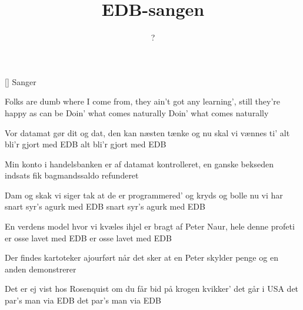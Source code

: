\documentclass[a4paper,11pt]{article}
\title{EDB-sangen}
\author{?}
\begin{document}
\maketitle

\begin{roles}  
[] Sanger
\end{roles}

\begin{song}
Folks are dumb
where I come from,
they ain't got any learning',
still they're happy as can be
Doin' what comes naturally
Doin' what comes naturally

Vor datamat
gør dit og dat,
den kan næsten tænke
og nu skal vi vænnes ti'
alt bli'r gjort med EDB
alt bli'r gjort med EDB

Min konto i handelsbanken
er af datamat kontrolleret,
en ganske bekseden indsats
fik bagmandssaldo refunderet

Dam og skak
vi siger tak
at de er programmered'
og kryds og bolle nu vi har
snart syr's agurk med EDB
snart syr's agurk med EDB

En verdens model
hvor vi kvæles ihjel
er bragt af Peter Naur,
hele denne profeti
er osse lavet med EDB
er osse lavet med EDB

Der findes kartoteker
ajourført når det sker
at en Peter skylder penge
og en anden demonstrerer

Det er ej vist
hos Rosenquist
om du får bid på krogen
kvikker' det går i USA
det par's man via EDB
det par's man via EDB
\end{song}
\end{document}
